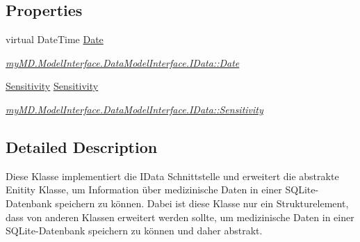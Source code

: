 \subsection*{Properties}
\begin{CompactItemize}
\item 
\hypertarget{classmy_m_d_1_1_model_1_1_data_model_1_1_data_44749712dbec183e983dcd78a7736c41}{
virtual Date\-Time \hyperlink{classmy_m_d_1_1_model_1_1_data_model_1_1_data_44749712dbec183e983dcd78a7736c41}{Date}}
\label{db/dac/classmy_m_d_1_1_model_1_1_data_model_1_1_data_44749712dbec183e983dcd78a7736c41}

\begin{CompactList}\small\item\em \hyperlink{interfacemy_m_d_1_1_model_interface_1_1_data_model_interface_1_1_i_data_44749712dbec183e983dcd78a7736c41}{my\-MD.Model\-Interface.Data\-Model\-Interface.IData::Date} \item\end{CompactList}\item 
\hypertarget{classmy_m_d_1_1_model_1_1_data_model_1_1_data_456ce8fc5315d26a3f7145a5228d8fd3}{
\hyperlink{namespacemy_m_d_1_1_model_interface_1_1_data_model_interface_456ce8fc5315d26a3f7145a5228d8fd3}{Sensitivity} \hyperlink{classmy_m_d_1_1_model_1_1_data_model_1_1_data_456ce8fc5315d26a3f7145a5228d8fd3}{Sensitivity}}
\label{db/dac/classmy_m_d_1_1_model_1_1_data_model_1_1_data_456ce8fc5315d26a3f7145a5228d8fd3}

\begin{CompactList}\small\item\em \hyperlink{interfacemy_m_d_1_1_model_interface_1_1_data_model_interface_1_1_i_data_456ce8fc5315d26a3f7145a5228d8fd3}{my\-MD.Model\-Interface.Data\-Model\-Interface.IData::Sensitivity} \item\end{CompactList}\end{CompactItemize}


\subsection{Detailed Description}
Diese Klasse implementiert die IData Schnittstelle und erweitert die abstrakte Enitity Klasse, um Information \"{u}ber medizinische Daten in einer SQLite-Datenbank speichern zu k\"{o}nnen. Dabei ist diese Klasse nur ein Strukturelement, dass von anderen Klassen erweitert werden sollte, um medizinische Daten in einer SQLite-Datenbank speichern zu k\"{o}nnen und daher abstrakt. 

